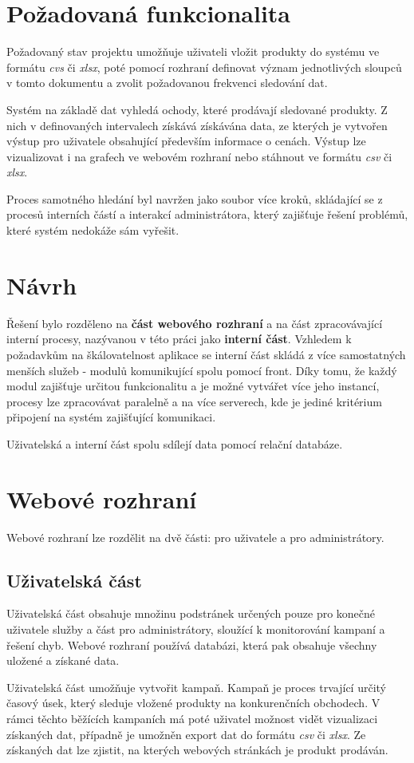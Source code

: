 \documentclass[thesis=B,czech]{FITthesis}[2012/06/26]
\begin{document}
\section{Požadovaná funkcionalita}
Požadovaný stav projektu umožňuje uživateli vložit produkty do systému ve formátu \textit{cvs} či \textit{xlsx}, poté pomocí
rozhraní definovat význam jednotlivých sloupců v tomto dokumentu a zvolit požadovanou frekvenci sledování dat.
\par
Systém na základě dat vyhledá ochody, které prodávají sledované produkty. Z nich v definovaných intervalech získává získávána data, ze kterých je vytvořen výstup pro uživatele obsahující především informace o cenách. Výstup lze vizualizovat i na grafech ve webovém rozhraní nebo stáhnout ve formátu
\textit{csv} či \textit{xlsx}.
\par
Proces samotného hledání byl navržen jako soubor více kroků, skládající se z procesů interních částí a interakcí administrátora, který zajišťuje
řešení problémů, které systém nedokáže sám vyřešit.

\section{Návrh}
Řešení bylo rozděleno na \textbf{část webového rozhraní} a na část zpracovávající interní procesy, nazývanou v této práci 
jako \textbf{interní část}.
Vzhledem k požadavkům na škálovatelnost aplikace se interní část skládá z více samostatných menších služeb - modulů komunikující
spolu pomocí front. Díky tomu, že každý modul zajišťuje určitou funkcionalitu a je možné vytvářet více jeho instancí, procesy lze 
zpracovávat paralelně a na více serverech, kde je jediné kritérium připojení na systém zajišťující komunikaci.
\par
Uživatelská a interní část spolu sdílejí data pomocí relační databáze\cite{DB}.

\section{Webové rozhraní}
Webové rozhraní lze rozdělit na dvě části: pro uživatele a pro administrátory. 

\subsection{Uživatelská část}\label{ch:analysis-front-end}
Uživatelská část obsahuje množinu podstránek určených pouze pro konečné uživatele
služby a část pro administrátory, sloužící k monitorování kampaní a řešení chyb. Webové rozhraní používá databázi, která pak 
obsahuje všechny uložené a získané data.
\par
Uživatelská část umožňuje vytvořit kampaň. Kampaň je proces trvající určitý časový úsek, který sleduje vložené produkty na konkurenčních
obchodech.
V rámci těchto běžících kampaních má poté uživatel možnost vidět vizualizaci získaných dat, případně je umožněn export dat do formátu
\textit{csv} či \textit{xlsx}. Ze získaných dat lze zjistit, na kterých webových stránkách je produkt prodáván.
\end{document}
